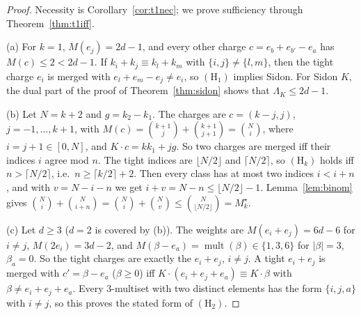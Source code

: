 \documentclass[11pt]{article}
\newcommand{\mult}{\operatorname{mult}}
\theoremstyle{definition}
\theoremstyle{remark}
\begin{document}
\begin{proof}
Necessity is Corollary~\ref{cor:t1nec}; we prove sufficiency through Theorem~\ref{thm:t1iff}.

(a) For $k=1$, $M(e_j)=2d-1$, and every other charge $c=e_b+e_{b'}-e_a$ has $M(c)\le2<2d-1$. If $k_i+k_j\equiv k_l+k_m$ with
$\{i,j\}\ne\{l,m\}$, then the tight charge $e_i$ is merged with $e_l+e_m-e_j\ne e_i$, so $(\mathrm H_1)$ implies Sidon. For Sidon $K$, the
dual part of the proof of Theorem~\ref{thm:sidon} shows that $\Lambda_K\le2d-1$.

(b) Let $N=k+2$ and $g=k_2-k_1$. The charges are $c=(k-j,j)$, $j=-1,\dots,k+1$, with
$M(c)=\binom{k+1}j+\binom{k+1}{j+1}=\binom N{i}$, where $i=j+1\in[0,N]$, and $K\cdot c=kk_1+jg$. So two charges are merged iff their indices
$i$ agree mod $n$. The tight indices are $\lfloor N/2\rfloor$ and $\lceil N/2\rceil$, so $(\mathrm H_k)$ holds iff $n>\lceil N/2\rceil$,
i.e.\ $n\ge\lceil k/2\rceil+2$. Then every class has at most two indices $i<i+n$, and with $v=N-i-n$ we get
$i+v=N-n\le\lfloor N/2\rfloor-1$. Lemma~\ref{lem:binom} gives $\binom Ni+\binom N{i+n}=\binom Ni+\binom Nv\le\binom N{\lfloor N/2\rfloor}=M^\star_k$.

(c) Let $d\ge3$ ($d=2$ is covered by (b)). The weights are $M(e_i+e_j)=6d-6$ for $i\ne j$, $M(2e_i)=3d-2$, and
$M(\beta-e_a)=\mult(\beta)\in\{1,3,6\}$ for $|\beta|=3$, $\beta_a=0$. So the tight charges are exactly the $e_i+e_j$, $i\ne j$.
A tight $e_i+e_j$ is merged with $c'=\beta-e_a$ ($\beta\ge0$) iff $K\cdot(e_i+e_j+e_a)\equiv K\cdot\beta$ with $\beta\ne e_i+e_j+e_a$. Every
$3$-multiset with two distinct elements has the form $\{i,j,a\}$ with $i\ne j$, so this proves the stated form of $(\mathrm H_2)$.


\end{proof}
\end{document}
